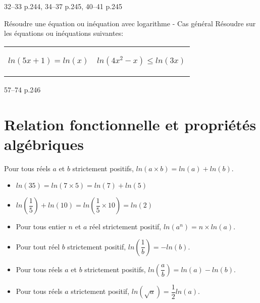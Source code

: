 \documentclass[a4paper]{article}
\begin{document}
  
\begin{exercices}{}{}
  32--33 p.244, 34--37 p.245, 40--41 p.245
  \end{exercices}


\begin{methode}{Résoudre une équation ou inéquation avec logarithme - Cas général}{}
  Résoudre sur les équations ou inéquations suivantes:
  
  \begin{tabular}{c|c}
    \begin{minipage}{8cm}
      \begin{center}
        
        $ln(5x+1)=ln(x)$
        \vspace{10cm}
      \end{center}
    \end{minipage}&
    \begin{minipage}{8cm}
      \begin{center}
        
    $ln(4x^2-x)\leqslant ln(3x)$
        \vspace{10cm}
      \end{center}
    \end{minipage}
  \end{tabular}
  \end{methode}

\begin{exercices}{}{}
57--74 p.246
\end{exercices}

\pagebreak

\section{Relation fonctionnelle et propriétés algébriques}
\begin{theoreme}{}{}
  Pour tous réels $a$ et $b$ strictement positifs, $ln(a\times b)=ln(a)+ln(b)$.
\end{theoreme}
\begin{example}{}{}

\begin{itemize}[label=\textbullet]
  \item $ln(35)=ln(7\times5)=ln(7)+ln(5)$
  \item $ln(\dfrac{1}{5})+ln(10)=ln(\dfrac{1}{5}\times 10 )=ln(2)$
\end{itemize}
\end{example}


\begin{propriete}{}{}
\begin{itemize}[label=\textbullet]
  \item Pour tous entier $n$ et $a$ réel strictement positif, $ln(a^n)=n\times ln(a)$.
  \item Pour tout réel $b$ strictement positif, $ln\left(\dfrac{1}{b}\right)=-ln(b)$.
  \item Pour tous réels $a$ et $b$ strictement positifs, $ln\left(\dfrac{a}{b}\right)=ln(a)-ln(b)$.
  \item Pour tous réels $a$ strictement positif, $ln\left(\sqrt{a}\right)=\dfrac{1}{2}ln(a)$. 
\end{itemize}
\end{propriete}
\end{document}
